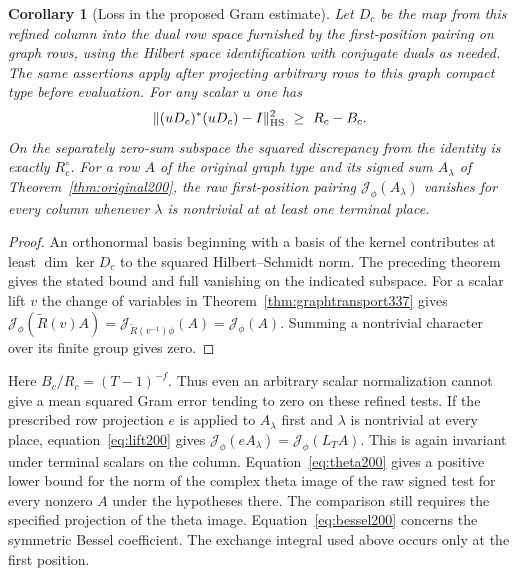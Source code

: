 \documentclass[a4paper,11pt]{article}
\newtheorem{corollary}[proposition]{Corollary}
\theoremstyle{definition}
\theoremstyle{remark}
\numberwithin{equation}{section}
\begin{document}
\begin{corollary}[Loss in the proposed Gram estimate]\label{cor:rankobstruction337}
Let \(D_c\) be the map from this refined column into the dual row
space furnished by the first-position pairing on graph rows, using
the Hilbert space identification with conjugate duals as needed.
The same assertions apply after projecting arbitrary rows to this
graph compact type before evaluation. For any scalar \(u\) one has
\[
 \|(uD_c)^*(uD_c)-I\|_{\rm HS}^2\ \ge\ R_c-B_c .
\]
On the separately zero-sum subspace the squared discrepancy from
the identity is exactly \(R_c^\circ\). For a row \(A\) of the original
graph type and its signed sum \(A_\lambda\) of
Theorem~\ref{thm:original200}, the raw first-position pairing
\(\mathcal J_\phi(A_\lambda)\) vanishes for every column whenever
\(\lambda\) is nontrivial at at least one terminal place.
\end{corollary}
\begin{proof}
An orthonormal basis beginning with a basis of the kernel
contributes at least \(\dim\ker D_c\) to the squared Hilbert--Schmidt
norm. The preceding theorem gives the stated bound and full
vanishing on the indicated subspace. For a scalar lift \(v\)
the change of variables in Theorem~\ref{thm:graphtransport337}
gives \(\mathcal J_\phi(\widetilde R(v)A)
=\mathcal J_{\widetilde R(v^{-1})\phi}(A)=\mathcal J_\phi(A)\).
Summing a nontrivial character over its finite group gives zero.
\end{proof}

Here \(B_c/R_c=(T-1)^{-f}\). Thus even an arbitrary scalar
normalization cannot give a mean squared Gram error tending to
zero on these refined tests. If the prescribed row projection
\(e\) is applied to \(A_\lambda\) first and \(\lambda\) is nontrivial
at every place, equation~\eqref{eq:lift200} gives
\(\mathcal J_\phi(eA_\lambda)=\mathcal J_\phi(L_T A)\).
This is again invariant under terminal scalars on the column.
Equation~\eqref{eq:theta200} gives a positive lower bound for
the norm of the complex theta image of the raw signed test for
every nonzero \(A\) under the hypotheses there. The comparison
still requires the specified projection of the theta image.
Equation~\eqref{eq:bessel200} concerns the symmetric Bessel coefficient.
The exchange integral used above occurs only at the first position.
\end{document}
